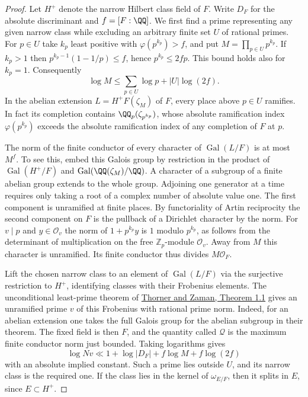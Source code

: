 \documentclass[a4paper,11pt]{article}
\theoremstyle{definition}
\theoremstyle{remark}
\newcommand{\ZZ}{\mathbb Z}\newcommand{\ord}{\operatorname{ord}}
\numberwithin{equation}{section}
\newcommand{\OO}{\mathcal O}
\begin{document}
\begin{proof}
Let \(H^+\) denote the narrow Hilbert class field of \(F\).
Write \(D_F\) for the absolute discriminant and \(f=[F:\QQ]\).
We first find a prime representing any given narrow class
while excluding an arbitrary finite set \(U\) of rational
primes. For \(p\in U\) take \(k_p\) least positive with
\(\varphi(p^{k_p})>f\), and put \(M=\prod_{p\in U}p^{k_p}\).
If \(k_p>1\) then \(p^{k_p-1}(1-1/p)\le f\), hence
\(p^{k_p}\le 2fp\). This bound holds also for \(k_p=1\).
Consequently
\[
       \log M\le\sum_{p\in U}\log p+|U|\log(2f).
\]
In the abelian extension \(L=H^+F(\zeta_M)\) of \(F\), every
place above \(p\in U\) ramifies. In fact its completion
contains \(\QQ_p(\zeta_{p^{k_p}})\), whose absolute ramification
index \(\varphi(p^{k_p})\) exceeds the absolute ramification
index of any completion of \(F\) at \(p\).

The norm of the finite conductor of every character of
\(\operatorname{Gal}(L/F)\) is at most \(M^f\). To see this,
embed this Galois group by restriction in the product of
\(\operatorname{Gal}(H^+/F)\) and
\(\operatorname{Gal}(\QQ(\zeta_M)/\QQ)\). A character of a
subgroup of a finite abelian group extends to the whole
group. Adjoining one generator at a time requires only
taking a root of a complex number of absolute value one.
The first component is unramified at finite places. By
functoriality of Artin reciprocity the second component on
\(F\) is the pullback of a Dirichlet character by the norm.
For \(v\mid p\) and \(y\in\OO_v\) the norm of
\(1+p^{k_p}y\) is \(1\) modulo \(p^{k_p}\), as follows from
the determinant of multiplication on the free
\(\ZZ_p\)-module \(\OO_v\). Away from \(M\) this character is
unramified. Its finite conductor thus divides \(M\OO_F\).

Lift the chosen narrow class to an element of
\(\operatorname{Gal}(L/F)\) via the surjective restriction
to \(H^+\), identifying classes with their Frobenius elements.
The unconditional least-prime theorem of
\href{https://arxiv.org/pdf/1604.01750}{Thorner and Zaman,
Theorem 1.1} gives an unramified prime \(v\) of this Frobenius
with rational prime norm. Indeed, for an abelian extension
one takes the full Galois group for the abelian subgroup in
their theorem. The fixed field is then \(F\), and the
quantity called \(\mathcal Q\) is the maximum finite
conductor norm just bounded. Taking logarithms gives
\[
      \log Nv\ll 1+\log |D_F|+f\log M+f\log(2f)
\]
with an absolute implied constant. Such a prime lies outside
\(U\), and its narrow class is the required one. If the
class lies in the kernel of \(\omega_{E/F}\), then it splits
in \(E\), since \(E\subset H^+\).


\end{proof}
\end{document}
